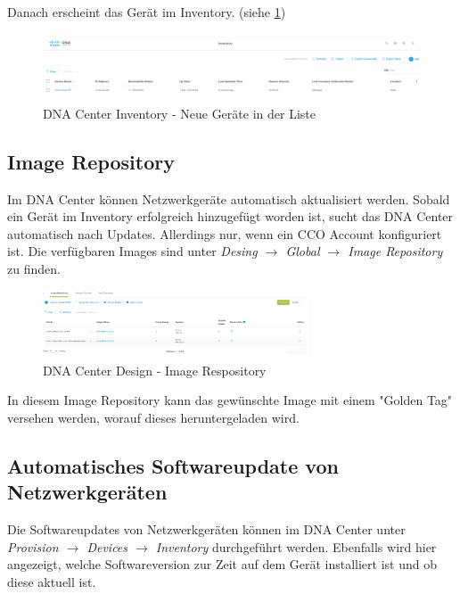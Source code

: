 Danach erscheint das Gerät im Inventory. (siehe \ref{fig:dna-center-inventory-index-new})

\begin{figure}[H]
	\centering
	\includegraphics[height=2cm]{img/dna-center-inventory-index-new.png}
	\caption{DNA Center Inventory - Neue Geräte in der Liste}
	\label{fig:dna-center-inventory-index-new}
\end{figure}


\subsection{Image Repository}
Im DNA Center können Netzwerkgeräte automatisch aktualisiert werden. Sobald ein Gerät im Inventory erfolgreich hinzugefügt worden ist, sucht das DNA Center automatisch nach Updates. Allerdings nur, wenn ein CCO Account konfiguriert ist. Die verfügbaren Images sind unter \textit{Desing $\rightarrow$ Global $\rightarrow$ Image Repository} zu finden.

\begin{figure}[H]
	\centering
	\includegraphics[height=2cm]{img/dna-center-design-image-repository.png}
	\caption{DNA Center Design - Image Respository}
	\label{fig:dna-center-design-image-repository}
\end{figure}

In diesem Image Repository kann das gewünschte Image mit einem "Golden Tag" versehen werden, worauf dieses heruntergeladen wird. 

\subsection{Automatisches Softwareupdate von Netzwerkgeräten}
Die Softwareupdates von Netzwerkgeräten können im DNA Center unter \textit{Provision $\rightarrow$ Devices $\rightarrow$ Inventory} durchgeführt werden. Ebenfalls wird hier angezeigt, welche Softwareversion zur Zeit auf dem Gerät installiert ist und ob diese aktuell ist.

